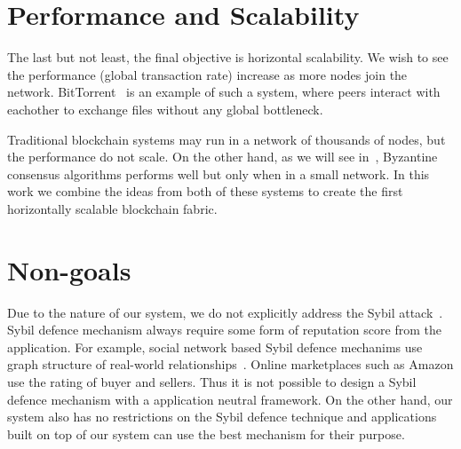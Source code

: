 \section{Performance and Scalability}

The last but not least, the final objective is horizontal scalability.
We wish to see the performance (global transaction rate) increase as more nodes join the network.
BitTorrent~\cite{cohen2003incentives} is an example of such a system,
where peers interact with eachother to exchange files without any global bottleneck.

Traditional blockchain systems may run in a network of thousands of nodes, but the performance do not scale.
On the other hand, as we will see in~, Byzantine consensus algorithms performs well but only when in a small network.
In this work we combine the ideas from both of these systems to create the first horizontally scalable blockchain fabric.

\section{Non-goals}
Due to the nature of our system, we do not explicitly address the Sybil attack~\cite{douceur2002sybil}.
Sybil defence mechanism always require some form of reputation score from the application.
For example, social network based Sybil defence mechanims use graph structure of real-world relationships~\cite{yu2006sybilguard}.
Online marketplaces such as Amazon use the rating of buyer and sellers.
Thus it is not possible to design a Sybil defence mechanism with a application neutral framework.
On the other hand, our system also has no restrictions on the Sybil defence technique
and applications built on top of our system can use the best mechanism for their purpose.



